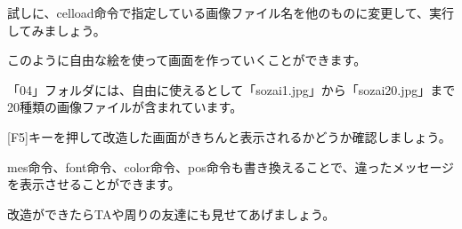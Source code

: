 試しに、celload命令で指定している画像ファイル名を他のものに変更して、実行してみましょう。

このように自由な絵を使って画面を作っていくことができます。


\begin{description}
    \item {}
\end{description}



「04」フォルダには、自由に使えるとして「sozai1.jpg」から「sozai20.jpg」まで20種類の画像ファイルが含まれています。

[F5]キーを押して改造した画面がきちんと表示されるかどうか確認しましょう。

mes命令、font命令、color命令、pos命令も書き換えることで、違ったメッセージを表示させることができます。

改造ができたらTAや周りの友達にも見せてあげましょう。









